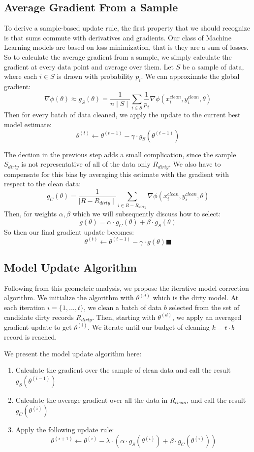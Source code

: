 \subsection{Average Gradient From a Sample}
To derive a sample-based update rule, the first property that we should recognize is that sums commute with derivatives and gradients.
Our class of Machine Learning models are based on loss minimization, that is they are a sum of losses.
So to calculate the average gradient from a sample, we simply calculate the gradient at every data point and average over them.
Let $S$ be a sample of data, where each $i \in S$ is drawn with probability $p_i$.
We can approximate the global gradient:
\[
\nabla\phi(\theta) \approx g_{S}(\theta) = \frac{1}{n\mid S \mid} \sum_{i \in S}\frac{1}{p_i}\nabla\phi(x_i^{clean},y_i^{clean},\theta)
\]
Then for every batch of data cleaned, we apply the update to the current best model estimate:
\[
\theta^{(t)} \leftarrow \theta^{(t-1)} - \gamma \cdot g_{S}(\theta^{(t-1)})
\]

The dection in the previous step adds a small complication, since the sample $S_{dirty}$ is not representative of all of the data only $R_{dirty}$.
We also have to compensate for this bias by averaging this estimate with the gradient with respect to the clean data:
\[
g_C(\theta) = \frac{1}{\mid R - R_{dirty}\mid}\sum_{i \in R - R_{dirty}}\nabla\phi(x_i^{clean},y_i^{clean},\theta)
\]
Then, for weights $\alpha,\beta$ which we will subsequently discuss how to select:
\[
g(\theta) = \alpha \cdot g_C(\theta) + \beta \cdot g_S(\theta)
\]
So then our final gradient update becomes:
\[
\theta^{(t)} \leftarrow \theta^{(t-1)} - \gamma \cdot g(\theta) \blacksquare
\]

\subsection{Model Update Algorithm}
Following from this geometric analysis, we propose the iterative model correction algorithm.
We initialize the algorithm with $\theta^{(d)}$ which is the dirty model.
At each iteration $i=\{1,...,t\}$, we clean a batch of data $b$ selected from the set of candidate dirty records $R_{dirty}$.
Then, starting with $\theta^{(d)}$, we apply an averaged gradient update to get $\theta^{(i)}$.
We iterate until our budget of cleaning $k = t \cdot b$ record is reached.

We present the model update algorithm here:
\begin{enumerate}[noitemsep]
	\item Calculate the gradient over the sample of clean data and call the result $g_S(\theta^{(i-1)})$
	\item Calculate the average gradient over all the data in $R_{clean}$, and call the result $g_C(\theta^{(i)})$
	\item Apply the following update rule:
	\[
	\theta^{(i+1)} \leftarrow \theta^{(i)} - \lambda \cdot(\alpha\cdot g_S(\theta^{(i)}) + \beta \cdot  g_C(\theta^{(i)}))
	\]
\end{enumerate} 

